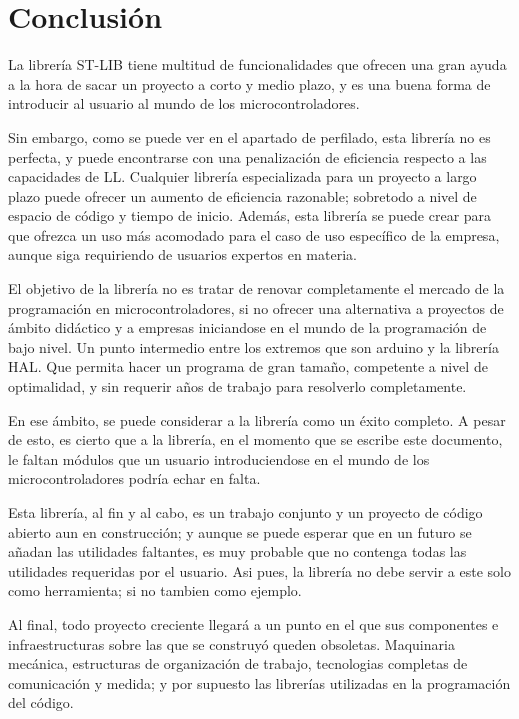 \documentclass{report}
\begin{document}
\section{Conclusión}
La librería ST-LIB tiene multitud de funcionalidades que ofrecen una gran ayuda a la hora de sacar un proyecto a corto y medio plazo, y es una buena forma de introducir al usuario al mundo de los microcontroladores. \par
Sin embargo, como se puede ver en el apartado de perfilado, esta librería no es perfecta, y puede encontrarse con una penalización de eficiencia respecto a las capacidades de LL. Cualquier librería especializada para un proyecto a largo plazo puede ofrecer un aumento de eficiencia razonable; sobretodo a nivel de espacio de código y tiempo de inicio. Además, esta librería se puede crear para que ofrezca un uso más acomodado para el caso de uso específico de la empresa, aunque siga requiriendo de usuarios expertos en materia. 
\par \vspace{0.3cm}
El objetivo de la librería no es tratar de renovar completamente el mercado de la programación en microcontroladores, si no ofrecer una alternativa a proyectos de ámbito didáctico y a empresas iniciandose en el mundo de la programación de bajo nivel. Un punto intermedio entre los extremos que son arduino y la librería HAL. Que permita hacer un programa de gran tamaño, competente a nivel de optimalidad, y sin requerir años de trabajo para resolverlo completamente.
\par
En ese ámbito, se puede considerar a la librería como un éxito completo. A pesar de esto, es cierto que a la librería, en el momento que se escribe este documento, le faltan módulos que un usuario introduciendose en el mundo de los microcontroladores podría echar en falta. 
\par
Esta librería, al fin y al cabo, es un trabajo conjunto y un proyecto de código abierto aun en construcción; y aunque se puede esperar que en un futuro se añadan las utilidades faltantes, es muy probable que no contenga todas las utilidades requeridas por el usuario. Asi pues, la librería no debe servir a este solo como herramienta; si no tambien como ejemplo. 
\par \vspace{0.3cm}
Al final, todo proyecto creciente llegará a un punto en el que sus componentes e infraestructuras sobre las que se construyó queden obsoletas. Maquinaria mecánica, estructuras de organización de trabajo, tecnologias completas de comunicación y medida; y por supuesto las librerías utilizadas en la programación del código. 
\end{document}
